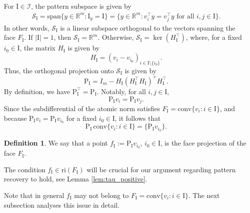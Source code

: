 \documentclass[12pt]{amsart}
\numberwithin{equation}{section}
\numberwithin{equation}{section}
\theoremstyle{definition}
\newtheorem{defin}[thm]{Definition}
\newcommand{\R}{\mathbb{R}}
\newcommand{\I}{\mathrm{I}}
\newcommand{\PP}{\mathrm{P}}
\renewcommand{\SS}{\mathcal{S}}
\begin{document}
For $\I\in\mathcal{I}$,  the pattern subspace is given by
\begin{align*}
\SS_{\I} = \mathrm{span}\{y\in\R^m\colon \I_y=\I\}= \{ y\in\R^m\colon v_i^\top y = v_j^\top y
\mbox{ for all }i,j\in \I\}.
\end{align*}
In other words, $\SS_{\I}$ is a linear subspace orthogonal to the vectors spanning the face $F_{\I}$.
If $|\I|= 1$, then $\SS_{\I} = \R^m$. 
Otherwise, 
$\SS_{\I} = \ker(H_{\I}^\top)$,
where, for a fixed $i_0\in \I$,  the matrix $H_{\I}$ is given by
\[
H_{\I} = (v_i-v_{i_0})_{i\in\I\setminus\{i_0\}}. 
\]
Thus, the orthogonal projection onto $\SS_{\I}$ is given by 
\[
\PP_{\I} =  I_m - H_{\I} (H_{\I}^\top H_{\I})^+ H_{\I}^\top.
\]
By definition, we have $\PP_{\I}^\top = \PP_{\I}$.
Notably,  for all $i,j\in \I$,
\[
\PP_{\I} v_i = \PP_{\I} v_j.
\]
Since the subdifferential of the atomic norm satisfies $F_{\I}= \mathrm{conv}\{v_i\colon i\in \I\}$, and because $\PP_{\I} v_i =\PP_{\I} v_{i_0}$ for a fixed $i_0\in \I$, it follows that
\[
\PP_{\I} \,\mathrm{conv}\{v_i\colon i\in\I\} = \{ \PP_{\I} v_{i_0}\}.
\]
\begin{defin}\label{def:f}
We say that a point $f_{\I}:=\PP_{\I} v_{i_0}$, $i_0\in\I$, is the face projection of the face $F_{\I}$. 
\end{defin}

The condition $f_\I\in \mathrm{ri}(F_\I)$ will be crucial for our argument regarding pattern recovery to hold, see Lemma \ref{lem:tau_positive}.

Note that in general $f_\I$ may not belong to $F_\I=\mathrm{conv}\{v_i\colon i\in \I\}$.  The next subsection analyses this issue in detail.
\end{document}
